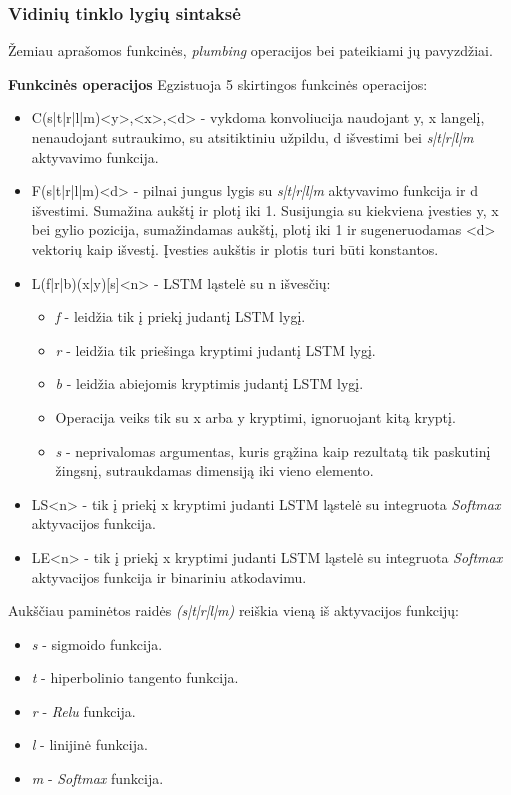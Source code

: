 \documentclass{VUMIFInfBakalaurinis}
\begin{document}
\subsubsection{Vidinių tinklo lygių sintaksė}
Žemiau aprašomos funkcinės, \textit{plumbing} operacijos bei pateikiami jų pavyzdžiai.

\textbf{Funkcinės operacijos}
Egzistuoja 5 skirtingos funkcinės operacijos:

\begin{itemize}
  \item C(s|t|r|l|m)<y>,<x>,<d> - vykdoma konvoliucija naudojant y, x langelį, nenaudojant sutraukimo, su atsitiktiniu užpildu, d išvestimi bei \textit{s|t|r|l|m} aktyvavimo funkcija.
  \item F(s|t|r|l|m)<d> - pilnai jungus lygis su \textit{s|t|r|l|m} aktyvavimo funkcija ir d išvestimi.
  Sumažina aukštį ir plotį iki 1. Susijungia su kiekviena įvesties y, x bei gylio pozicija, sumažindamas aukštį, plotį iki 1 ir sugeneruodamas <d> vektorių kaip išvestį.
  Įvesties aukštis ir plotis turi būti konstantos.
  \item L(f|r|b)(x|y)[s]<n> - LSTM ląstelė su n išvesčių:
  \begin{itemize}
    \item \textit{f} - leidžia tik į priekį judantį LSTM lygį.
    \item \textit{r} - leidžia tik priešinga kryptimi judantį LSTM lygį.
    \item \textit{b} - leidžia abiejomis kryptimis judantį LSTM lygį.
    \item Operacija veiks tik su x arba y kryptimi, ignoruojant kitą kryptį.
    \item \textit{s} - neprivalomas argumentas, kuris grąžina kaip rezultatą tik paskutinį žingsnį, sutraukdamas dimensiją iki vieno elemento.
  \end{itemize}
  \item LS<n> - tik į priekį x kryptimi judanti LSTM ląstelė su integruota \textit{Softmax} aktyvacijos funkcija.
  \item LE<n> - tik į priekį x kryptimi judanti LSTM ląstelė su integruota \textit{Softmax} aktyvacijos funkcija ir binariniu atkodavimu.
\end{itemize}

Aukščiau paminėtos raidės \textit{(s|t|r|l|m)} reiškia vieną iš aktyvacijos funkcijų:

\begin{itemize}
  \item \textit{s} - sigmoido funkcija.
  \item \textit{t} - hiperbolinio tangento funkcija.
  \item \textit{r} - \textit{Relu} funkcija.
  \item \textit{l} - linijinė funkcija.
  \item \textit{m} - \textit{Softmax} funkcija.
\end{itemize}
\end{document}
